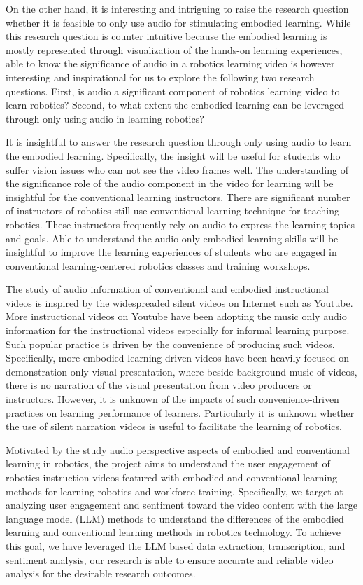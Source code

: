 On the other hand, it is interesting and intriguing to raise the research question whether it is feasible to only use audio for stimulating embodied learning. While this research question is counter intuitive because the embodied learning is mostly represented through visualization of the hands-on learning experiences, able to know the significance of audio in a robotics learning video is however interesting and inspirational for us to explore the following two research questions. First, is audio a significant component of robotics learning video to learn robotics?  Second, to what extent the embodied learning can be leveraged through only using audio in learning robotics?

It is insightful to answer the research question through only using audio to learn the embodied learning. Specifically, the insight will be useful for students who suffer vision issues who can not see the video frames well. The understanding of the significance role of the audio component in the video for learning will be insightful for the conventional learning instructors. There are significant number of instructors of robotics still use conventional learning technique for teaching robotics. These instructors frequently rely on audio to express the learning topics and goals. Able to understand the audio only embodied learning skills will be insightful to improve the learning experiences of students who are engaged in conventional learning-centered robotics classes and training workshops. 

The study of audio information of conventional and embodied instructional videos is inspired by the widespreaded silent videos on Internet such as Youtube. More instructional videos on Youtube have been adopting the music only audio information for the instructional videos especially for informal learning purpose. Such popular practice is driven by the convenience of producing such videos. Specifically, more embodied learning driven videos have been heavily focused on demonstration only visual presentation, where beside background music of videos, there is no narration of the visual presentation from video producers or instructors. However, it is unknown of the impacts of such convenience-driven practices on learning performance of learners. Particularly it is unknown whether the use of silent narration videos is useful to facilitate the learning of robotics.  



\noindent Motivated by the study audio perspective aspects of embodied and conventional learning in robotics, the project aims to understand the user engagement of robotics instruction videos featured with embodied and conventional learning methods for learning robotics and workforce training. Specifically, we target at analyzing user engagement and sentiment toward the video content with the large language model (LLM) methods to understand the differences of the embodied learning and conventional learning methods in robotics technology.  To achieve this goal, we have leveraged the LLM based data extraction, transcription, and sentiment analysis, our research is able to ensure accurate and reliable video analysis for the desirable research outcomes. 


